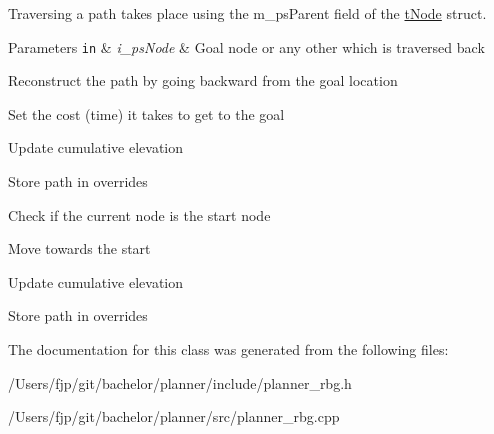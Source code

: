 Traversing a path takes place using the m\+\_\+ps\+Parent field of the \mbox{\hyperlink{structplanner_1_1t_node}{t\+Node}} struct. 
\begin{DoxyParams}[1]{Parameters}
\mbox{\tt in}  & {\em i\+\_\+ps\+Node} & Goal node or any other which is traversed back \\
\hline
\end{DoxyParams}
Reconstruct the path by going backward from the goal location

Set the cost (time) it takes to get to the goal

Update cumulative elevation

Store path in overrides

Check if the current node is the start node

Move towards the start

Update cumulative elevation

Store path in overrides 

The documentation for this class was generated from the following files\+:\begin{DoxyCompactItemize}
\item 
/\+Users/fjp/git/bachelor/planner/include/planner\+\_\+rbg.\+h\item 
/\+Users/fjp/git/bachelor/planner/src/planner\+\_\+rbg.\+cpp\end{DoxyCompactItemize}
